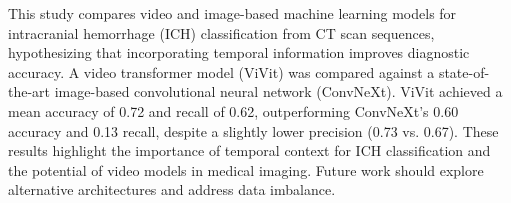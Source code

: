 This study compares video and image-based machine learning models for intracranial hemorrhage (ICH) classification from CT scan sequences, hypothesizing that incorporating temporal information improves diagnostic accuracy. A video transformer model (ViVit) was compared against a state-of-the-art image-based convolutional neural network (ConvNeXt). ViVit achieved a mean accuracy of 0.72 and recall of 0.62, outperforming ConvNeXt's 0.60 accuracy and 0.13 recall, despite a slightly lower precision (0.73 vs. 0.67). These results highlight the importance of temporal context for ICH classification and the potential of video models in medical imaging. Future work should explore alternative architectures and address data imbalance.